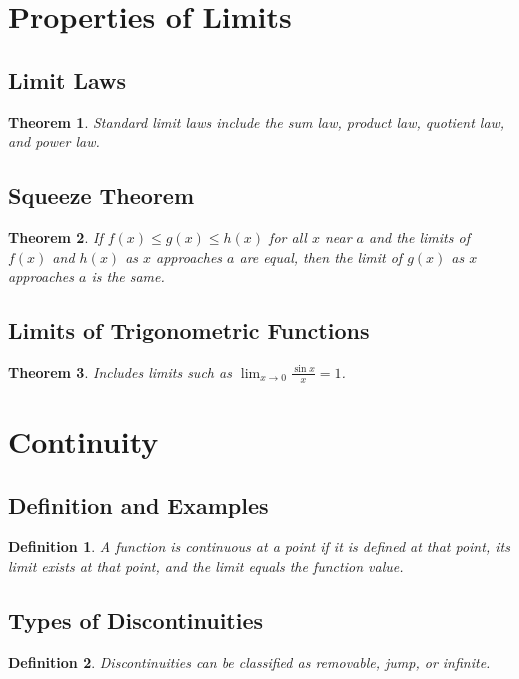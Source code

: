 \documentclass[a4paper,12pt]{book}
\newtheorem{theorem}{Theorem}
\newtheorem{definition}{Definition}
\begin{document}
\section{Properties of Limits}
\subsection{Limit Laws}
\begin{theorem}
Standard limit laws include the sum law, product law, quotient law, and power law.
\end{theorem}

\subsection{Squeeze Theorem}
\begin{theorem}
If \( f(x) \leq g(x) \leq h(x) \) for all \( x \) near \( a \) and the limits of \( f(x) \) and \( h(x) \) as \( x \) approaches \( a \) are equal, then the limit of \( g(x) \) as \( x \) approaches \( a \) is the same.
\end{theorem}

\subsection{Limits of Trigonometric Functions}
\begin{theorem}
Includes limits such as \( \lim_{x \to 0} \frac{\sin x}{x} = 1 \).
\end{theorem}

\section{Continuity}
\subsection{Definition and Examples}
\begin{definition}
A function is continuous at a point if it is defined at that point, its limit exists at that point, and the limit equals the function value.
\end{definition}

\subsection{Types of Discontinuities}
\begin{definition}
Discontinuities can be classified as removable, jump, or infinite.
\end{definition}
\end{document}
